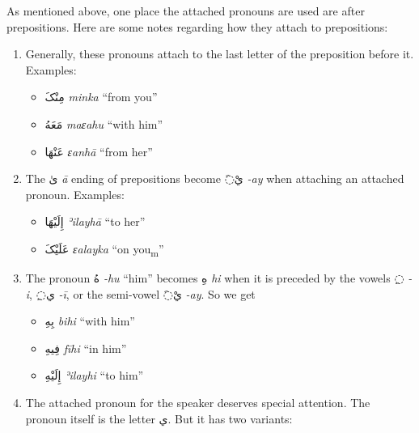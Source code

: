 \documentclass[
  10pt,
]{book}
\providecommand{\tightlist}{%
  \setlength{\itemsep}{0pt}\setlength{\parskip}{0pt}}
\begin{document}
As mentioned above, one place the attached pronouns are used are after prepositions.
Here are some notes regarding how they attach to prepositions:

\begin{enumerate}
\def\labelenumi{\arabic{enumi}.}
\item
  Generally, these pronouns attach to the last letter of the preposition before it. Examples:

  \begin{itemize}
  \tightlist
  \item
    \foreignlanguage{arabic}{مِنْکَ} \emph{minka} \enquote{from you}
  \item
    \foreignlanguage{arabic}{مَعَهُ} \emph{maɛahu} \enquote{with him}
  \item
    \foreignlanguage{arabic}{عَنْهَا} \emph{ɛanhā} \enquote{from her}
  \end{itemize}
\item
  The \foreignlanguage{arabic}{ىٰ} \emph{ā} ending of prepositions become \foreignlanguage{arabic}{◌َيْ} \emph{-ay} when attaching an attached pronoun. Examples:

  \begin{itemize}
  \tightlist
  \item
    \foreignlanguage{arabic}{إِلَيْهَا} \emph{ʾilayhā} \enquote{to her}
  \item
    \foreignlanguage{arabic}{عَلَيْکَ} \emph{ɛalayka} \enquote{on you\textsubscript{m}}
  \end{itemize}
\item
  The pronoun \foreignlanguage{arabic}{هُ} \emph{-hu} \enquote{him} becomes \foreignlanguage{arabic}{هِ} \emph{hi} when it is preceded by the vowels \foreignlanguage{arabic}{◌ِ} \emph{-i}, \foreignlanguage{arabic}{◌ِي} \emph{-ī}, or the semi-vowel \foreignlanguage{arabic}{◌َيْ} \emph{-ay}. So we get

  \begin{itemize}
  \tightlist
  \item
    \foreignlanguage{arabic}{بِهِ} \emph{bihi} \enquote{with him}
  \item
    \foreignlanguage{arabic}{فِيهِ} \emph{fīhi} \enquote{in him}
  \item
    \foreignlanguage{arabic}{إِلَيْهِ} \emph{ʾilayhi} \enquote{to him}
  \end{itemize}
\item
  The attached pronoun for the speaker deserves special attention. The pronoun itself is the letter \foreignlanguage{arabic}{ي}. But it has two variants:


\end{enumerate}
\end{document}
